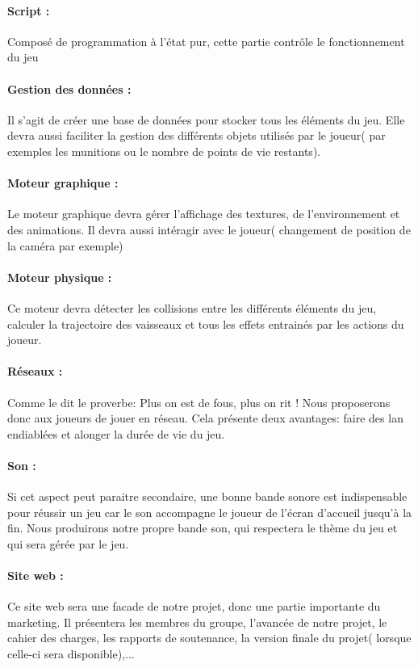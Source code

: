 \documentclass[10pt, titlepage]{report}
\begin{document}
\paragraph{Script :}
Composé de programmation à l'état pur, cette partie contrôle le fonctionnement du jeu

\paragraph{Gestion des données :}
Il s'agit de créer une base de données pour stocker tous les éléments du jeu. Elle devra aussi faciliter la gestion des différents objets utilisés par le joueur( par exemples les munitions ou le nombre de points de vie restants).

\paragraph{Moteur graphique :}
Le moteur graphique devra gérer l'affichage des textures, de l'environnement et des animations. Il devra aussi intéragir avec le joueur( changement de position de la caméra par exemple)

\paragraph{Moteur physique :}
Ce moteur devra détecter les collisions entre les différents éléments du jeu, calculer la trajectoire des vaisseaux et tous les effets entrainés par les actions du joueur.

\paragraph{Réseaux :}
Comme le dit le proverbe: Plus on est de fous, plus on rit ! Nous proposerons donc aux joueurs de jouer en réseau. Cela présente deux avantages: faire des lan endiablées et alonger la durée de vie du jeu.

\paragraph{Son :}
Si cet aspect peut paraitre secondaire, une bonne bande sonore est indispensable pour réussir un jeu car le son accompagne le joueur de l'écran d'accueil jusqu'à la fin. Nous produirons notre propre bande son, qui respectera le thème du jeu et qui sera gérée par le jeu.

\paragraph{Site web :}
Ce site web sera une facade de notre projet, donc une partie importante du marketing. Il présentera les membres du groupe, l'avancée de notre projet, le cahier des charges, les rapports de soutenance, la version finale du projet( lorsque celle-ci sera disponible),...
\end{document}
